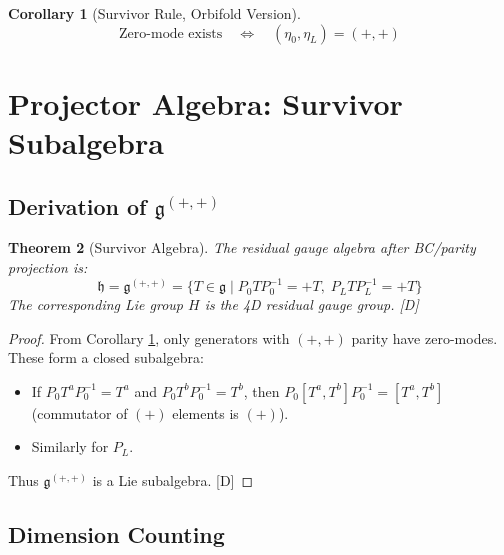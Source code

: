\documentclass[11pt,a4paper]{article}
\newtheorem{theorem}{Theorem}[section]
\newtheorem{corollary}[theorem]{Corollary}
\newcommand{\tagD}{\textcolor{blue!70!black}{[D]}}
\begin{document}
\begin{corollary}[Survivor Rule, Orbifold Version]
\label{cor:survivor-orbifold}
\begin{equation}
\label{eq:survivor-orbifold}
\boxed{\text{Zero-mode exists} \quad \Leftrightarrow \quad (\eta_0, \eta_L) = (+, +)}
\end{equation}
\end{corollary}

\section{Projector Algebra: Survivor Subalgebra}

\subsection{Derivation of $\mathfrak{g}^{(+,+)}$}

\begin{theorem}[Survivor Algebra]
\label{thm:survivor-algebra}
The residual gauge algebra after BC/parity projection is:
\begin{equation}
\label{eq:survivor-algebra}
\boxed{\mathfrak{h} = \mathfrak{g}^{(+,+)} =
\{T \in \mathfrak{g} \mid P_0 T P_0^{-1} = +T,\; P_L T P_L^{-1} = +T\}}
\end{equation}
The corresponding Lie group $H$ is the 4D residual gauge group. \tagD
\end{theorem}

\begin{proof}
From Corollary \ref{cor:survivor-orbifold}, only generators with $(+,+)$ parity
have zero-modes. These form a closed subalgebra:
\begin{itemize}
    \item If $P_0 T^a P_0^{-1} = T^a$ and $P_0 T^b P_0^{-1} = T^b$, then
    $P_0 [T^a, T^b] P_0^{-1} = [T^a, T^b]$ (commutator of $(+)$ elements is $(+)$).
    \item Similarly for $P_L$.
\end{itemize}
Thus $\mathfrak{g}^{(+,+)}$ is a Lie subalgebra. \tagD
\end{proof}

\subsection{Dimension Counting}
\end{document}
